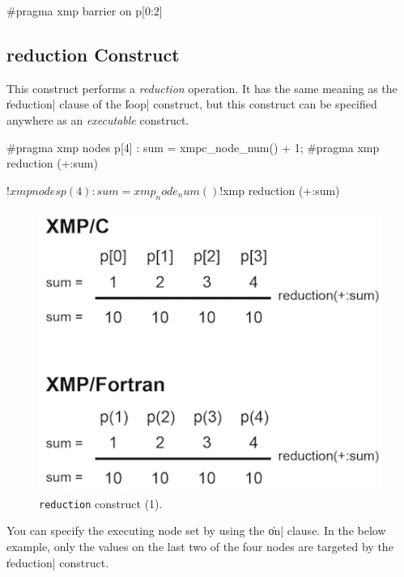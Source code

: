 \begin{XCexample}
#pragma xmp barrier on p[0:2]
\end{XCexample}



\subsection{{\bf reduction} Construct}

This construct performs a {\it reduction} operation. It has the same
meaning as the \|reduction| clause of the \|loop| construct, but this
construct can be specified anywhere as an {\it executable} construct.

\begin{XCexample}
#pragma xmp nodes p[4]
  :
sum = xmpc_node_num() + 1;
#pragma xmp reduction (+:sum)
\end{XCexample}

\begin{XFexample}
!$xmp nodes p(4)
  :
sum = xmp_node_num()
!$xmp reduction (+:sum)
\end{XFexample}

\begin{figure}
  \centering
  \includegraphics{figs/reduction.png}
  \caption{{\tt reduction} construct (1).}
\end{figure}

You can specify the executing node set by using the \|on| clause. In the
below example, only the values on the last two of the four nodes are
targeted by the \|reduction| construct.

